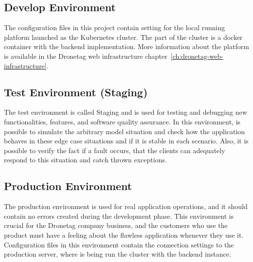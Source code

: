 \subsection{Develop Environment}\label{subsec:develop-environment}
The configuration files in this project contain setting for the local running platform launched as the Kubernetes cluster.
The part of the cluster is a docker container with the backend implementation.
More information about the platform is available in the Dronetag web infrastructure chapter~\ref{ch:dronetag-web-infrastructure}.


\subsection{Test Environment (Staging)}\label{subsec:test-environment}
The test environment is called Staging and is used for testing and debugging new functionalities, features, and software quality assurance.\cite{sqa}
In this environment, is possible to simulate the arbitrary model situation and check how the application behaves in these edge case situations and if it is stable in each scenario.
Also, it is possible to verify the fact if a fault occurs, that the clients can adequately respond to this situation and catch thrown exceptions.


\subsection{Production Environment}\label{subsec:production-environment}
The production environment is used for real application operations, and it should contain no errors created during the development phase.
This environment is crucial for the Dronetag company business, and the customers who use the product must have a feeling about the flawless application whenever they use it.
Configuration files in this environment contain the connection settings to the production server, where is being run the cluster with the backend instance.
